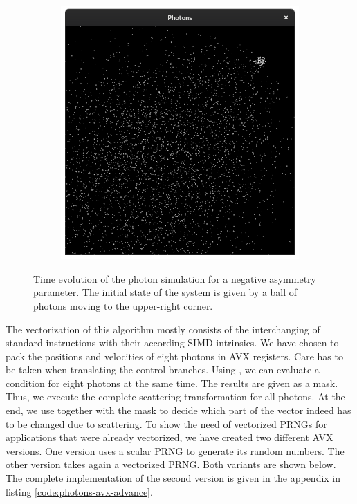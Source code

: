 \documentclass{stdlocal}
\begin{document}
\begin{figure}[p]
\begin{subfigure}[b]{0.24\textwidth}
      \end{subfigure}
      \begin{subfigure}[b]{0.24\textwidth}
        \center
        \includegraphics[width=\textwidth,trim={0 0 0 2cm},clip]{images/photons_2_08.png}
      \end{subfigure}
      \caption[Photon Simulation Time Evolution for Negative Asymmetry Parameter]{%
        Time evolution of the photon simulation for a negative asymmetry parameter.
        The initial state of the system is given by a ball of photons moving to the upper-right corner.
      }
      \label{fig:photons-time-evolution-negative}
    \end{figure}

    The vectorization of this algorithm mostly consists of the interchanging of standard instructions with their according SIMD intrinsics.
    We have chosen to pack the positions and velocities of eight photons in AVX registers.
    Care has to be taken when translating the control branches.
    Using , we can evaluate a condition for eight photons at the same time.
    The results are given as a mask.
    Thus, we execute the complete scattering transformation for all photons.
    At the end, we use  together with the mask to decide which part of the vector indeed has to be changed due to scattering.
    To show the need of vectorized PRNGs for applications that were already vectorized, we have created two different AVX versions.
    One version uses a scalar PRNG to generate its random numbers.
    The other version takes again a vectorized PRNG.
    Both variants are shown below.
    The complete implementation of the second version is given in the appendix in listing \ref{code:photons-avx-advance}.
\end{document}
